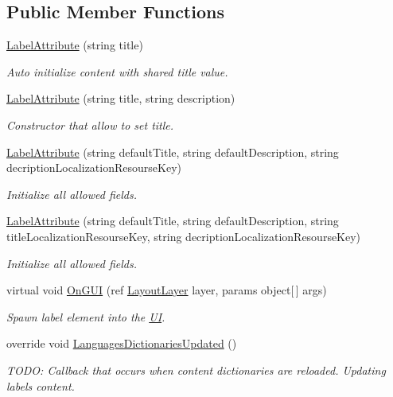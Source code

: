 \subsection*{Public Member Functions}
\begin{DoxyCompactItemize}
\item 
\mbox{\hyperlink{class_wpf_handler_1_1_u_i_1_1_auto_layout_1_1_controls_1_1_label_attribute_af52c1a4d96d9ab17f369a6c6423f58fb}{Label\+Attribute}} (string title)
\begin{DoxyCompactList}\small\item\em Auto initialize content with shared title value. \end{DoxyCompactList}\item 
\mbox{\hyperlink{class_wpf_handler_1_1_u_i_1_1_auto_layout_1_1_controls_1_1_label_attribute_a961e0cd1faee5baad4ced251193adcc4}{Label\+Attribute}} (string title, string description)
\begin{DoxyCompactList}\small\item\em Constructor that allow to set title. \end{DoxyCompactList}\item 
\mbox{\hyperlink{class_wpf_handler_1_1_u_i_1_1_auto_layout_1_1_controls_1_1_label_attribute_ae3fc540124479e4cdc343ab23ae1a1c9}{Label\+Attribute}} (string default\+Title, string default\+Description, string decription\+Localization\+Resourse\+Key)
\begin{DoxyCompactList}\small\item\em Initialize all allowed fields. \end{DoxyCompactList}\item 
\mbox{\hyperlink{class_wpf_handler_1_1_u_i_1_1_auto_layout_1_1_controls_1_1_label_attribute_abfc5ebdb910630168db5f10fdbb713b7}{Label\+Attribute}} (string default\+Title, string default\+Description, string title\+Localization\+Resourse\+Key, string decription\+Localization\+Resourse\+Key)
\begin{DoxyCompactList}\small\item\em Initialize all allowed fields. \end{DoxyCompactList}\item 
virtual void \mbox{\hyperlink{class_wpf_handler_1_1_u_i_1_1_auto_layout_1_1_controls_1_1_label_attribute_a86bdaaa6d028cbdee8536138e63d0159}{On\+G\+UI}} (ref \mbox{\hyperlink{class_wpf_handler_1_1_u_i_1_1_auto_layout_1_1_layout_layer}{Layout\+Layer}} layer, params object\mbox{[}$\,$\mbox{]} args)
\begin{DoxyCompactList}\small\item\em Spawn label element into the \mbox{\hyperlink{namespace_wpf_handler_1_1_u_i}{UI}}. \end{DoxyCompactList}\item 
override void \mbox{\hyperlink{class_wpf_handler_1_1_u_i_1_1_auto_layout_1_1_controls_1_1_label_attribute_a3ed5f61dc946ffd5ce385cc4ef60362d}{Languages\+Dictionaries\+Updated}} ()
\begin{DoxyCompactList}\small\item\em T\+O\+DO\+: Callback that occurs when content dictionaries are reloaded. Updating label\textquotesingle{}s content. \end{DoxyCompactList}\end{DoxyCompactItemize}
